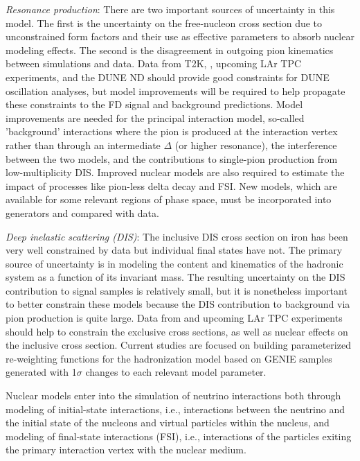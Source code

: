   \emph{Resonance production}:
  There are two important sources of uncertainty in this model. The first is the uncertainty on the free-nucleon
  cross section due to unconstrained form factors and their use as effective parameters to absorb nuclear
  modeling effects.
  The second is the disagreement in outgoing pion kinematics between simulations and data.
  Data from T2K, \minerva, upcoming LAr TPC experiments, and the DUNE ND should provide good constraints for DUNE
  oscillation analyses, but model improvements will be required to help propagate these constraints
  to the FD signal and background predictions. Model improvements are needed for the principal interaction
  model, so-called 'background' interactions where the pion is produced at the interaction vertex
  rather than through an intermediate $\Delta$ (or higher resonance), the interference between the two
  models, and the contributions to single-pion production from low-multiplicity DIS. Improved nuclear models
  are also required to estimate the impact of processes like pion-less delta decay and FSI. New models, which are
  available for some relevant regions of phase space, must be incorporated into generators and compared
  with data.

  \emph{Deep inelastic scattering (DIS)}: The inclusive DIS cross section on iron has been very well constrained by 
  data but individual final states have not. The primary source of uncertainty is in modeling the
  content and kinematics of the hadronic system as a function of its invariant mass. The resulting
  uncertainty on the DIS contribution to signal samples is relatively small, but it is nonetheless important
  to better constrain these models because the DIS contribution to background via pion production is quite large.
  Data from \minerva and upcoming LAr TPC experiments should help to constrain
  the exclusive cross sections, as well as nuclear effects on the inclusive cross section.
  Current studies are focused on building parameterized re-weighting 
  functions for the hadronization model based on GENIE samples generated with 1$\sigma$ changes to each relevant 
  model parameter.

Nuclear models enter into the simulation of neutrino interactions both through modeling of initial-state interactions,
i.e., interactions between the neutrino and the initial state of the nucleons and virtual particles within the nucleus,
and modeling of final-state interactions (FSI), i.e., interactions of the particles exiting the
primary interaction vertex with the nuclear medium. 

